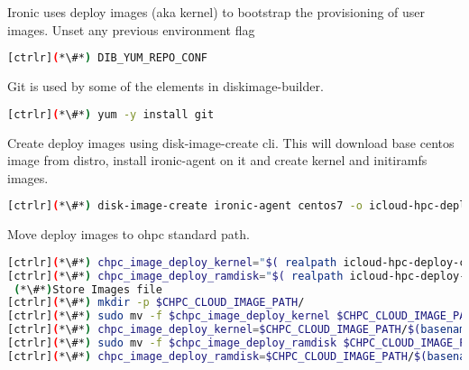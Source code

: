 Ironic uses deploy images (aka kernel) to bootstrap the provisioning of user images. 
Unset any previous environment flag

\begin{lstlisting}[language=bash,keywords={}]
[ctrlr](*\#*) DIB_YUM_REPO_CONF
\end{lstlisting}

Git is used by some of the elements in diskimage-builder. 

\begin{lstlisting}[language=bash,keywords={}]
[ctrlr](*\#*) yum -y install git
\end{lstlisting}

Create deploy images using disk-image-create cli. This will download base centos image from distro, install ironic-agent on it and create kernel and initiramfs images.

\begin{lstlisting}[language=bash,keywords={}]
[ctrlr](*\#*) disk-image-create ironic-agent centos7 -o icloud-hpc-deploy-c7
\end{lstlisting}

Move deploy images to ohpc standard path.

\begin{lstlisting}[language=bash,keywords={}]
[ctrlr](*\#*) chpc_image_deploy_kernel="$( realpath icloud-hpc-deploy-c7.kernel)"
[ctrlr](*\#*) chpc_image_deploy_ramdisk="$( realpath icloud-hpc-deploy-c7.initramfs)"
 (*\#*)Store Images file
[ctrlr](*\#*) mkdir -p $CHPC_CLOUD_IMAGE_PATH/
[ctrlr](*\#*) sudo mv -f $chpc_image_deploy_kernel $CHPC_CLOUD_IMAGE_PATH/
[ctrlr](*\#*) chpc_image_deploy_kernel=$CHPC_CLOUD_IMAGE_PATH/$(basename $chpc_image_deploy_kernel)
[ctrlr](*\#*) sudo mv -f $chpc_image_deploy_ramdisk $CHPC_CLOUD_IMAGE_PATH/
[ctrlr](*\#*) chpc_image_deploy_ramdisk=$CHPC_CLOUD_IMAGE_PATH/$(basename $chpc_image_deploy_ramdisk)
\end{lstlisting}